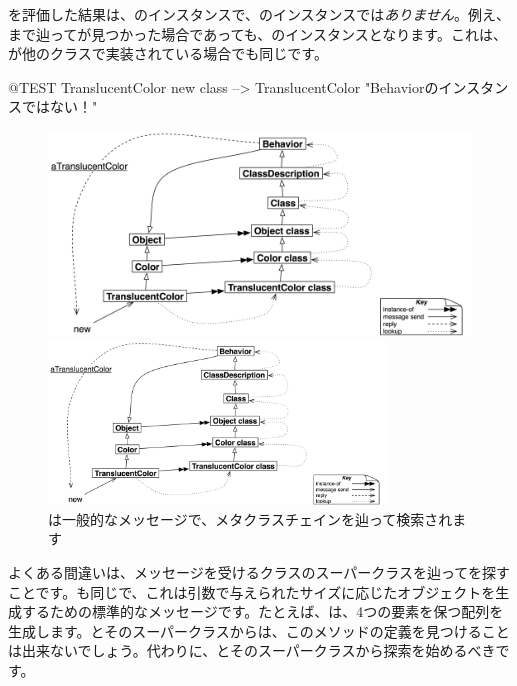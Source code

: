 \documentclass[a4paper,10pt,twoside]{book}
\begin{document}
を評価した結果は、のインスタンスで、のインスタンスでは\emph{ありません}。例え、まで辿ってが見つかった場合であっても、\self のインスタンスとなります。これは、が他のクラスで実装されている場合でも同じです。

\begin{code}{@TEST}
TranslucentColor new class --> TranslucentColor    "Behaviorのインスタンスではない！"
\end{code}

\begin{center}
\begin{figure}
\ifluluelse
	{\centerline{\includegraphics[width=\textwidth]{TranslucentSendingNew}}}
	{\centerline{\includegraphics[width=0.8\textwidth]{TranslucentSendingNew}}}
\caption{は一般的なメッセージで、メタクラスチェインを辿って検索されます}
\end{figure}
\end{center}

よくある間違いは、メッセージを受けるクラスのスーパークラスを辿ってを探すことです。も同じで、これは引数で与えられたサイズに応じたオブジェクトを生成するための標準的なメッセージです。たとえば、は、4つの要素を保つ配列を生成します。とそのスーパークラスからは、このメソッドの定義を見つけることは出来ないでしょう。代わりに、とそのスーパークラスから探索を始めるべきです。
\end{document}
